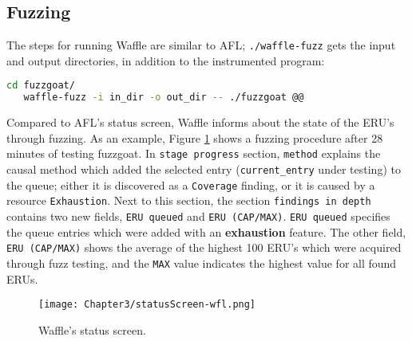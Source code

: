 
\subsection{Fuzzing}

The steps for running Waffle are similar to AFL; \texttt{./waffle-fuzz} gets the input and output directories, in addition to the instrumented program:

\begin{lstlisting}[language=bash,style=CommandStyle,label={lst:wafl-fuzzgoat-fuzz}]
   cd fuzzgoat/
   waffle-fuzz -i in_dir -o out_dir -- ./fuzzgoat @@
\end{lstlisting}

Compared to AFL's status screen, Waffle informs about the state of the ERU's through fuzzing. As an example, Figure \ref{fig:status-wfl} shows a fuzzing procedure after 28 minutes of testing fuzzgoat. In \texttt{stage progress} section, \texttt{method} explains the causal method which added the selected entry (\texttt{current\_entry} under testing) to the queue; either it is discovered as a \texttt{Coverage} finding, or it is caused by a resource \texttt{Exhaustion}. Next to this section, the section \texttt{findings in depth} contains two new fields, \texttt{ERU queued} and \texttt{ERU (CAP/MAX)}. \texttt{ERU queued} specifies the queue entries which were added with an \textbf{exhaustion} feature. The other field, \texttt{ERU (CAP/MAX)} shows the average of the highest 100 ERU's which were acquired through fuzz testing, and the \texttt{MAX} value indicates the highest value for all found ERUs. 

\begin{figure}[t]
   \texttt{[image: Chapter3/statusScreen-wfl.png]}
   \centering
   \caption{Waffle's status screen.}
   \label{fig:status-wfl}
\end{figure}

\newpage